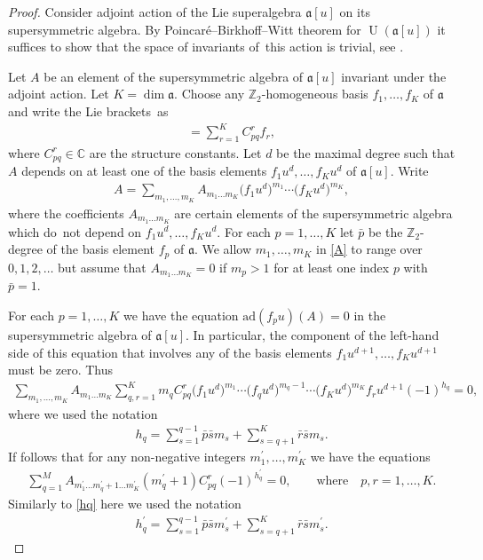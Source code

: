 \documentclass[10pt,a4paper]{amsart}
\numberwithin{equation}{section}
\def\a{\mathfrak{a}}
\def\bp{{\bar p }}
\def\br{{\bar r }}
\def\bs{{\bar s }}
\def\CC{{\mathbb{C}}}
\def\Ua{\operatorname{U}(\a [u])}
\def\ZZ{\mathbb{Z}}
\begin{document}
\begin{proof}
Consider adjoint action of the Lie superalgebra $\a [u]$
on its supersymmetric algebra. By
Poincar\'e--Birkhoff--Witt theorem for $\Ua$
it suffices to show that the space
of invariants of~this action is trivial,
see \cite[Theorem~5.15]{MM}.

Let $A$ be an element of the supersymmetric algebra of $\a [u]$
invariant under the adjoint action. Let $K=\dim\a $.
Choose any $\ZZ_2 $-homogeneous basis $f_1,\dots,f_K$ of $\a$ and
write the Lie brackets~as
\begin{gather*}
[ f_p ,f_q ]=\sum_{r=1}^K C_{pq}^{r} f_r,
\end{gather*}
where $C_{pq}^{r}\in\CC$ are the structure constants.
Let $d$ be the maximal degree such that $A$ depends on at least one
of the basis
elements $f_1 u^{d},\dots, f_K u^{d}$ of $\a [u] $. Write
\begin{gather}
\label{A}
A =\sum_{m_1,\dots,m_K}A_{m_1\dots m_K}
\big( f_1 u^{d} \big)^{m_1}\cdots\big( f_K u^{d} \big)^{m_K},
\end{gather}
where the coefficients $A_{m_1\dots m_K}$ are certain elements
of the supersymmetric algebra which do~not depend
on $f_1 u^{d},\dots, f_K u^{d} $.
For each $p=1,\dots, K$ let $\bp$ be the $\ZZ_2 $-degree of the basis element
$f_{p}$ of $\a $. We allow $m_1,\dots, m_K$ in \eqref{A}
to range over $0,1,2, \dots$ but assume that $A_{m_1\dots m_K}=0$
if $m_{p}>1$ for at least one index $p$ with $\bp=1 $.

For each $p=1,\dots, K$ we have the equation
$\text{ad} ( f_p u )(A)=0$ in the supersymmetric algebra
of $\a [u] $. In particular,
the component of the left-hand side of this equation
that involves any of the basis elements
$f_1 u^{d+1},\dots, f_K u^{d+1}$ must be zero. Thus
\begin{gather*}
\sum_{m_1,\dots,m_K}A_{m_1\dots m_K}
\sum_{q,r=1}^K
m_{q} C_{pq}^{r}
\big( f_1 u^{d} \big)^{m_1}
\cdots
\big( f_q u^{d} \big)^{m_{q}-1}
\cdots
\big( f_K u^{d} \big)^{m_K}
f_r u^{d+1}
(-1)^{h_{q}}=0,
\end{gather*}
where we used the notation
\begin{gather}\label{hq}
h_{q}=
\sum_{s=1}^{q-1} \bp \bs m_{s}
 + \sum_{s=q+1}^K\br \bs m_{s} .
\end{gather}
If follows that for any non-negative integers
$m_1^{\prime},\dots,m_K^{\prime}$ we have the equations
\begin{gather}\label{ad}
\sum_{q=1}^M
A_{m_1^{\prime}\dots m^{\prime}_q+1\dots m^{\prime}_K}
(m^{\prime}_q+1) C_{pq}^{r} (-1)^{h_{q}^{\prime}}=0,
\qquad\text{where}\quad
p ,r=1,\dots, K .
\end{gather}
Similarly to \eqref{hq} here we used the notation
\begin{gather*}
h_{q}^{\prime}=\sum_{s=1}^{q-1} \bp \bs m_{s}^{\prime}
 + \sum_{s=q+1}^K\br \bs m_{s}^{\prime} .
\end{gather*}


\end{proof}
\end{document}
